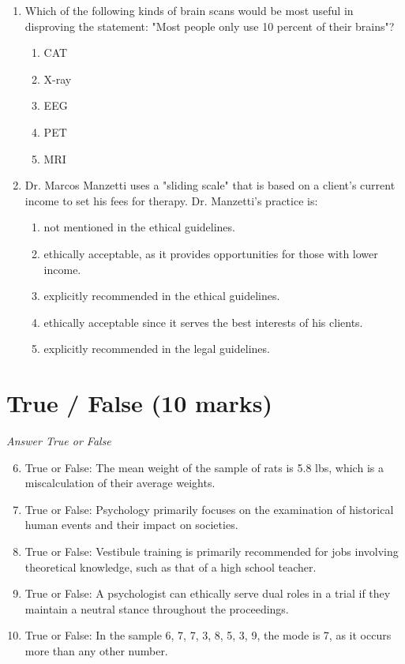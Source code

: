 \documentclass[12pt]{article}
\begin{document}
\begin{enumerate}[label=\arabic*.]
\item Which of the following kinds of brain scans would be most useful in disproving the statement: "Most people only use 10 percent of their brains"?
\begin{enumerate}[label=(\alph*)]
    \item CAT
    \item X-ray
    \item EEG
    \item PET
    \item MRI
\end{enumerate}
\item Dr. Marcos Manzetti uses a "sliding scale" that is based on a client's current income to set his fees for therapy. Dr. Manzetti's practice is:
\begin{enumerate}[label=(\alph*)]
    \item not mentioned in the ethical guidelines.
    \item ethically acceptable, as it provides opportunities for those with lower income.
    \item explicitly recommended in the ethical guidelines.
    \item ethically acceptable since it serves the best interests of his clients.
    \item explicitly recommended in the legal guidelines.
\end{enumerate}
\end{enumerate}

\section*{True / False (10 marks)}
\textit{Answer True or False}
\begin{enumerate}[label=\arabic*.]
\setcounter{enumi}{5}
\item True or False: The mean weight of the sample of rats is 5.8 lbs, which is a miscalculation of their average weights.
\item True or False: Psychology primarily focuses on the examination of historical human events and their impact on societies.
\item True or False: Vestibule training is primarily recommended for jobs involving theoretical knowledge, such as that of a high school teacher.
\item True or False: A psychologist can ethically serve dual roles in a trial if they maintain a neutral stance throughout the proceedings.
\item True or False: In the sample 6, 7, 7, 3, 8, 5, 3, 9, the mode is 7, as it occurs more than any other number.
\end{enumerate}
\end{document}
